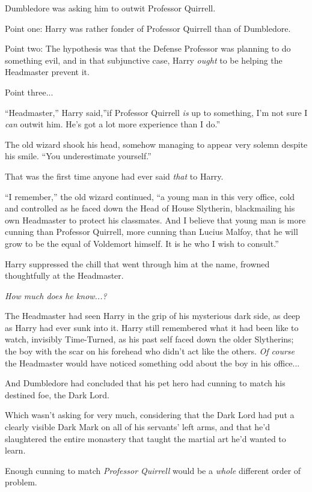 Dumbledore was asking him to outwit Professor Quirrell.

Point one: Harry was rather fonder of Professor Quirrell than of
Dumbledore.

Point two: The hypothesis was that the Defense Professor was planning to
do something evil, and in that subjunctive case, Harry \emph{ought} to
be helping the Headmaster prevent it.

Point three...

``Headmaster,'' Harry said,''if Professor Quirrell \emph{is} up to
something, I'm not sure I \emph{can} outwit him. He's got a lot more
experience than I do.''

The old wizard shook his head, somehow managing to appear very solemn
despite his smile. ``You underestimate yourself.''

That was the first time anyone had ever said \emph{that} to Harry.

``I remember,'' the old wizard continued, ``a young man in this very
office, cold and controlled as he faced down the Head of House
Slytherin, blackmailing his own Headmaster to protect his classmates.
And I believe that young man is more cunning than Professor Quirrell,
more cunning than Lucius Malfoy, that he will grow to be the equal of
Voldemort himself. It is he who I wish to consult.''

Harry suppressed the chill that went through him at the name, frowned
thoughtfully at the Headmaster.

\emph{How much does he know...?}

The Headmaster had seen Harry in the grip of his mysterious dark side,
as deep as Harry had ever sunk into it. Harry still remembered what it
had been like to watch, invisibly Time-Turned, as his past self faced
down the older Slytherins; the boy with the scar on his forehead who
didn't act like the others. \emph{Of course} the Headmaster would have
noticed something odd about the boy in his office...

And Dumbledore had concluded that his pet hero had cunning to match his
destined foe, the Dark Lord.

Which wasn't asking for very much, considering that the Dark Lord had
put a clearly visible Dark Mark on all of his servants' left arms, and
that he'd slaughtered the entire monastery that taught the martial art
he'd wanted to learn.

Enough cunning to match \emph{Professor Quirrell} would be a
\emph{whole} different order of problem.

